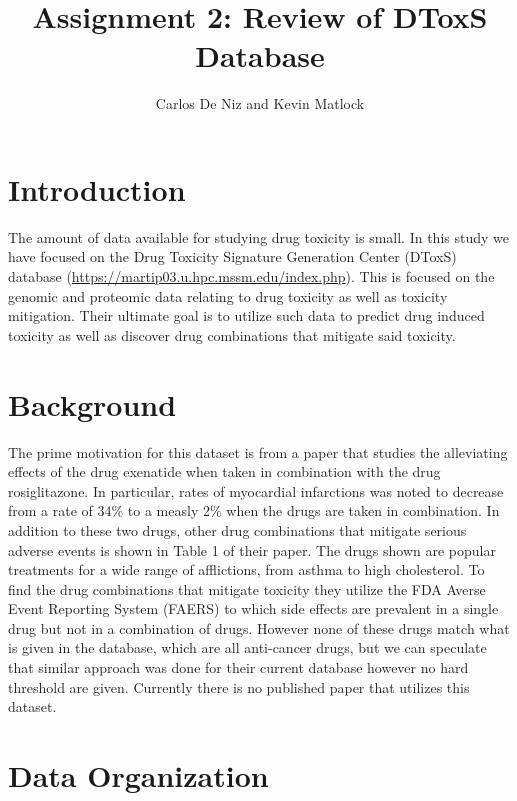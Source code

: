 \documentclass[]{article}
\title{Assignment 2: Review of DToxS Database}
\author{Carlos De Niz and Kevin Matlock}
\begin{document}
\date{}
\maketitle

\section{Introduction}
The amount of data available for studying drug toxicity is small. In this study we have focused on the Drug Toxicity Signature Generation Center (DToxS) database (\url{https://martip03.u.hpc.mssm.edu/index.php}).
This  is focused on the genomic and proteomic data relating to drug toxicity as well as toxicity mitigation. Their ultimate goal is to utilize such data to predict drug induced toxicity as well as discover drug combinations that mitigate said toxicity.

\section{Background}
The prime motivation for this dataset is from a paper that studies the alleviating effects of the drug exenatide when taken in combination with the drug rosiglitazone\cite{zhao_2013}. 
In particular, rates of myocardial infarctions was noted to decrease from a rate of 34\% to a measly 2\% when the drugs are taken in combination.
In addition to these two drugs, other drug combinations that mitigate serious adverse events is shown in Table 1 of their paper\cite{zhao_2013}. The drugs shown are popular treatments for a wide range of afflictions, from asthma to high cholesterol. 
To find the drug combinations that mitigate toxicity they utilize the FDA Averse Event Reporting System (FAERS) to which side effects are prevalent in a single drug but not in a combination of drugs.
However none of these drugs match what is given in the database, which are all anti-cancer drugs, but we can speculate that similar approach was done for their current database however no hard threshold are given.
Currently there is no published paper that utilizes this dataset.

\section{Data Organization}
\end{document}
